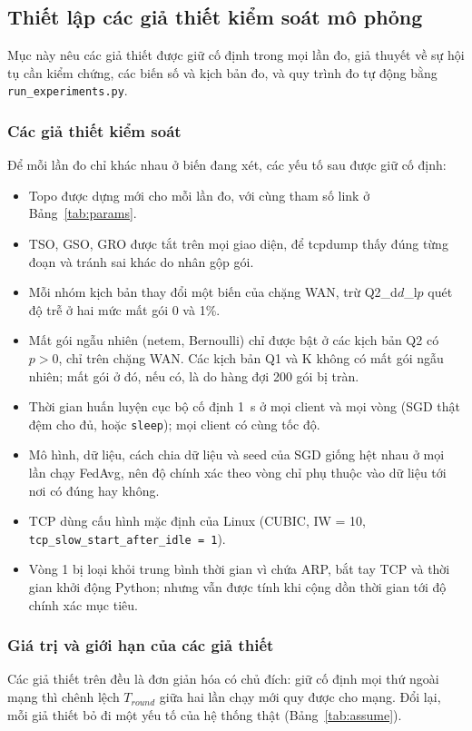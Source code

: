 \subsection{Thiết lập các giả thiết kiểm soát mô phỏng}
\label{sec:2-6}
Mục này nêu các giả thiết được giữ cố định trong mọi lần đo, giả thuyết về sự hội tụ cần kiểm chứng, các biến số và kịch bản đo, và quy trình đo tự động bằng \texttt{run\_experiments.py}.

\subsubsection{Các giả thiết kiểm soát}
Để mỗi lần đo chỉ khác nhau ở biến đang xét, các yếu tố sau được giữ cố định:
\begin{itemize}
    \item Topo được dựng mới cho mỗi lần đo, với cùng tham số link ở Bảng~\ref{tab:params}.
    \item TSO, GSO, GRO được tắt trên mọi giao diện, để tcpdump thấy đúng từng đoạn và tránh sai khác do nhân gộp gói.
    \item Mỗi nhóm kịch bản thay đổi một biến của chặng WAN, trừ Q2\_d$d$\_l$p$ quét độ trễ ở hai mức mất gói 0 và 1\%.
    \item Mất gói ngẫu nhiên (netem, Bernoulli) chỉ được bật ở các kịch bản Q2 có $p > 0$, chỉ trên chặng WAN. Các kịch bản Q1 và K không có mất gói ngẫu nhiên; mất gói ở đó, nếu có, là do hàng đợi 200 gói bị tràn.
    \item Thời gian huấn luyện cục bộ cố định 1~s ở mọi client và mọi vòng (SGD thật đệm cho đủ, hoặc \texttt{sleep}); mọi client có cùng tốc độ.
    \item Mô hình, dữ liệu, cách chia dữ liệu và seed của SGD giống hệt nhau ở mọi lần chạy FedAvg, nên độ chính xác theo vòng chỉ phụ thuộc vào dữ liệu tới nơi có đúng hay không.
    \item TCP dùng cấu hình mặc định của Linux (CUBIC, IW = 10, \nolinkurl{tcp_slow_start_after_idle = 1}).
    \item Vòng 1 bị loại khỏi trung bình thời gian vì chứa ARP, bắt tay TCP và thời gian khởi động Python; nhưng vẫn được tính khi cộng dồn thời gian tới độ chính xác mục tiêu.
\end{itemize}

\subsubsection{Giá trị và giới hạn của các giả thiết}
Các giả thiết trên đều là đơn giản hóa có chủ đích: giữ cố định mọi thứ ngoài mạng thì chênh lệch $T_{round}$ giữa hai lần chạy mới quy được cho mạng. Đổi lại, mỗi giả thiết bỏ đi một yếu tố của hệ thống thật (Bảng~\ref{tab:assume}).

